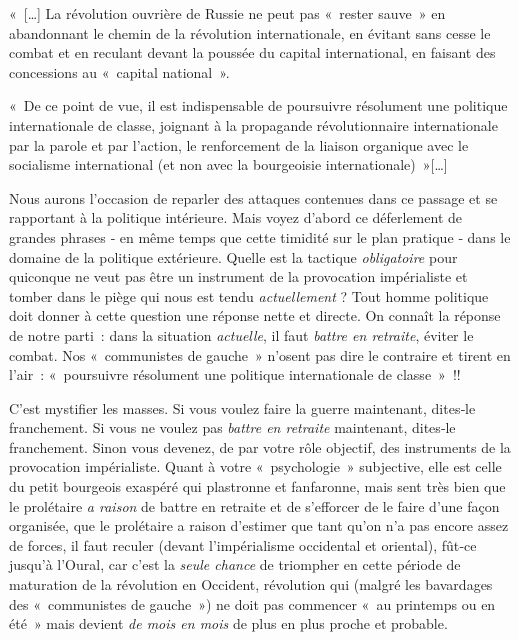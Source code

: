 \documentclass[french,twoside]{book} %
\newenvironment{quoteblock}%
  {\begin{quoting}}
  {\end{quoting}}
\newenvironment{quotebar}{%
    \def\FrameCommand{{\color{rubric!10!}\vrule width 0.5em} \hspace{0.9em}}%
    \def\OuterFrameSep{\itemsep} %
    \MakeFramed {\advance\hsize-\width \FrameRestore}
  }%
  {%
    \endMakeFramed
  }
\renewenvironment{quoteblock}%
  {%
    \savenotes
    \setstretch{0.9}
    \normalfont
    \begin{quotebar}
  }
  {%
    \end{quotebar}
    \spewnotes
  }
\begin{document}
\begin{quoteblock}
 \noindent « […] La révolution ouvrière de Russie ne peut pas « rester sauve » en abandonnant le chemin de la révolution internationale, en évitant sans cesse le combat et en reculant devant la poussée du capital international, en faisant des concessions au « capital national ».\par
 « De ce point de vue, il est indispensable de poursuivre résolument une politique internationale de classe, joignant à la propagande révolutionnaire internationale par la parole et par l’action, le renforcement de la liaison organique avec le socialisme international (et non avec la bourgeoisie internationale) »[…]
\end{quoteblock}

\noindent Nous aurons l’occasion de reparler des attaques contenues dans ce passage et se rapportant à la politique intérieure. Mais voyez d’abord ce déferlement de grandes phrases ‑ en même temps que cette timidité sur le plan pratique ‑ dans le domaine de la politique extérieure. Quelle est la tactique \emph{obligatoire} pour quiconque ne veut pas être un instrument de la provocation impérialiste et tomber dans le piège qui nous est tendu \emph{actuellement} ? Tout homme politique doit donner à cette question une réponse nette et directe. On connaît la réponse de notre parti : dans la situation \emph{actuelle}, il faut \emph{battre en retraite}, éviter le combat. Nos « communistes de gauche » n’osent pas dire le contraire et tirent en l’air : « poursuivre résolument une politique internationale de classe » !!\par
C'est mystifier les masses. Si vous voulez faire la guerre maintenant, dites‑le franchement. Si vous ne voulez pas \emph{battre en retraite} maintenant, dites‑le franchement. Sinon vous devenez, de par votre rôle objectif, des instruments de la provocation impérialiste. Quant à votre « psychologie » subjective, elle est celle du petit bourgeois exaspéré qui plastronne et fanfaronne, mais sent très bien que le prolétaire \emph{a raison} de battre en retraite et de s’efforcer de le faire d’une façon organisée, que le prolétaire a raison d’estimer que tant qu’on n’a pas encore assez de forces, il faut reculer (devant l’impérialisme occidental et oriental), fût‑ce jusqu’à l’Oural, car c’est la \emph{seule chance} de triompher en cette période de maturation de la révolution en Occident, révolution qui (malgré les bavardages des « communistes de gauche ») ne doit pas commencer « au printemps ou en été » mais devient \emph{de mois en mois} de plus en plus proche et probable.\par
\end{document}
